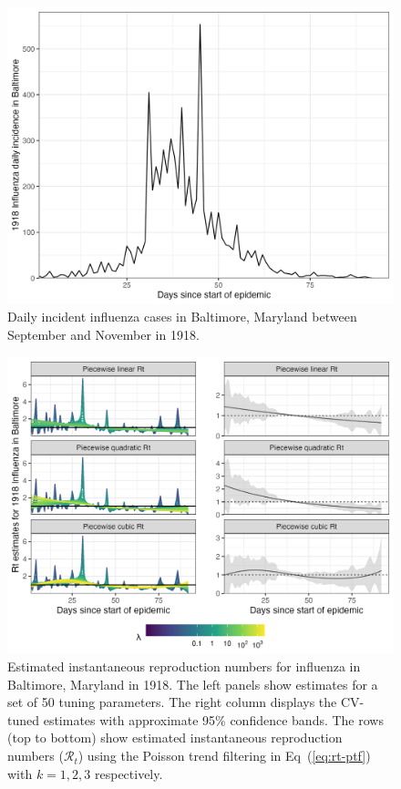 \documentclass[10pt,letterpaper]{article}
\def\calR{\mathcal{R}}
\renewcommand{\eqref}[1]{Eq~(\ref{#1})}
\begin{document}
\begin{figure}[!ht]
  \centering
  \includegraphics[width=0.8\linewidth]{fig/flu_dat.png}
  \caption{Daily incident influenza cases in Baltimore, Maryland between September 
  and November in 1918.} 
  \label{fig:flu-dat}
\end{figure} 

\begin{figure}[!ht]
  \centering
  \includegraphics[width=0.99\linewidth]{fig/flu_full_res.png}
  \caption{Estimated instantaneous reproduction numbers for influenza in Baltimore,
  Maryland in 1918. The left panels show estimates for a set of 50 tuning
  parameters. The right column displays the CV-tuned estimates with approximate
  95\% confidence bands. The rows (top to bottom) show estimated instantaneous reproduction
  numbers ($\calR_t$) using the Poisson trend filtering in \eqref{eq:rt-ptf}
  with $k=1,2,3$ respectively.} 
  \label{fig:flu-res}
\end{figure} 
\end{document}
